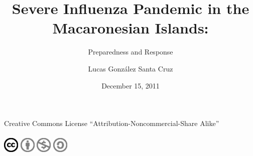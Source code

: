 \documentclass[12pt, a4]{scrartcl}
\title{Severe Influenza Pandemic in the Macaronesian Islands:}
\subtitle{Preparedness and Response}
\author{Lucas González Santa Cruz} \\
\date {December 15, 2011}
\begin{document}
\maketitle

\footnotesize { \centering
Creative Commons License “Attribution-Noncommercial-Share Alike”
\\
\\
\includegraphics[height=2em,width=2em]{license/cc.eps} \includegraphics[height=2em,width=2em]{license/by.eps} \includegraphics[height=2em,width=2em]{license/nc.eps} \includegraphics[height=2em,width=2em]{license/sa.eps}

} \\   %
\end{document}
